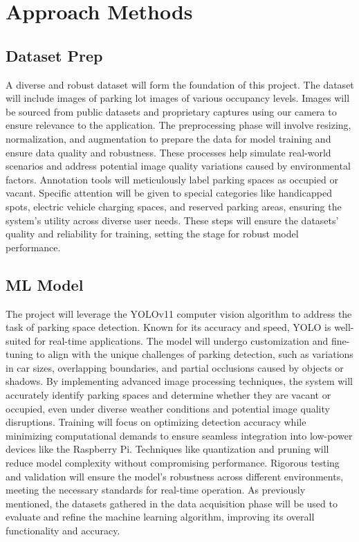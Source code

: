 \documentclass[conference]{IEEEtran}
\begin{document}
\section{Approach Methods}

\subsection{Dataset Prep}

A diverse and robust dataset will form the foundation of this project. 
The dataset will include images of parking lot images of various occupancy levels. 
Images will be sourced from public datasets and proprietary captures using our camera to ensure relevance to the application. 
The preprocessing phase will involve resizing, 
normalization, 
and augmentation to prepare the data for model training and ensure data quality and robustness. 
These processes help simulate real-world scenarios and address potential image quality variations caused by environmental factors. 
Annotation tools will meticulously label parking spaces as occupied or vacant. 
Specific attention will be given to special categories like handicapped spots, 
electric vehicle charging spaces, 
and reserved parking areas, 
ensuring the system’s utility across diverse user needs. 
These steps will ensure the datasets’ quality and reliability for training, 
setting the stage for robust model performance.

\subsection{ML Model}

The project will leverage the YOLOv11 computer vision algorithm \cite{yolo11_ultralytics} to address the task of parking space detection. 
Known for its accuracy and speed, 
YOLO is well-suited for real-time applications.
The model will undergo customization and fine-tuning to align with the unique challenges of parking detection, 
such as variations in car sizes, 
overlapping boundaries, 
and partial occlusions caused by objects or shadows. 
By implementing advanced image processing techniques, 
the system will accurately identify parking spaces and determine whether they are vacant or occupied, 
even under diverse weather conditions and potential image quality disruptions. 
Training will focus on optimizing detection accuracy while minimizing computational demands to ensure seamless integration into low-power devices like the Raspberry Pi. 
Techniques like quantization and pruning will reduce model complexity without compromising performance. 
Rigorous testing and validation will ensure the model’s robustness across different environments, 
meeting the necessary standards for real-time operation. 
As previously mentioned, 
the datasets gathered in the data acquisition phase will be used to evaluate and refine the machine learning algorithm, 
improving its overall functionality and accuracy.
\end{document}
